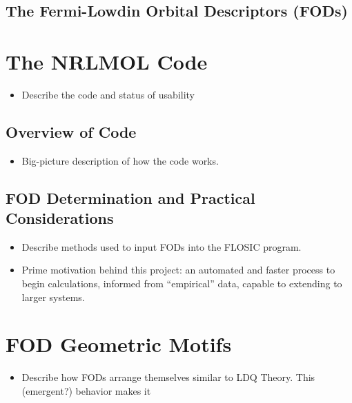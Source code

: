 \documentclass[12pt,a4paper,]{report}
\providecommand{\tightlist}{%
  \setlength{\itemsep}{0pt}\setlength{\parskip}{0pt}}
\begin{document}
\subsection{The Fermi-Lowdin Orbital Descriptors
(FODs)}\label{the-fermi-lowdin-orbital-descriptors-fods}

\section{The NRLMOL Code}\label{the-nrlmol-code}

\begin{itemize}
\tightlist
\item
  Describe the code and status of usability
\end{itemize}

\subsection{Overview of Code}\label{overview-of-code}

\begin{itemize}
\tightlist
\item
  Big-picture description of how the code works.
\end{itemize}

\subsection{FOD Determination and Practical
Considerations}\label{fod-determination-and-practical-considerations}

\begin{itemize}
\tightlist
\item
  Describe methods used to input FODs into the FLOSIC program.
\item
  Prime motivation behind this project: an automated and faster process
  to begin calculations, informed from ``empirical'' data, capable to
  extending to larger systems.
\end{itemize}

\section{FOD Geometric Motifs}\label{fod-geometric-motifs}

\begin{itemize}
\tightlist
\item
  Describe how FODs arrange themselves similar to LDQ Theory. This
  (emergent?) behavior makes it
\end{itemize}
\end{document}
